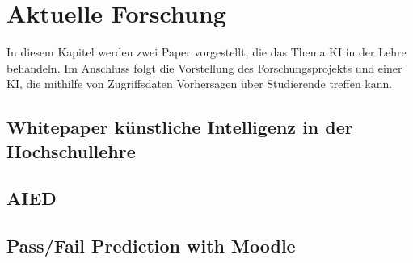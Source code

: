 \chapter{Aktuelle Forschung}
In diesem Kapitel werden zwei Paper vorgestellt, die das Thema KI in der Lehre behandeln.
Im Anschluss folgt die Vorstellung des Forschungsprojekts und einer KI, die mithilfe von Zugriffsdaten Vorhersagen über Studierende treffen kann.

\section{Whitepaper künstliche Intelligenz in der Hochschullehre}

\section{AIED}

\section{Pass/Fail Prediction with Moodle}
